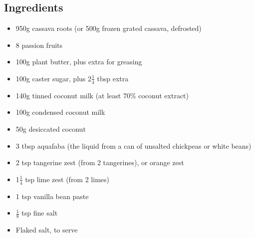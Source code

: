 \documentclass{book}
\begin{document}
\subsection*{Ingredients}
\begin{itemize}
\item 950g cassava roots (or 500g frozen grated cassava, defrosted)
\item 8 passion fruits
\item 100g plant butter, plus extra for greasing
\item 100g caster sugar, plus 2$\frac{1}{4}$ tbsp extra
\item 140g tinned coconut milk (at least 70\% coconut extract)
\item 100g condensed coconut milk
\item 50g desiccated coconut
\item 3 tbsp aquafaba (the liquid from a can of unsalted chickpeas or white beans)
\item 2 tsp tangerine zest (from 2 tangerines), or orange zest 
\item 1$\frac{1}{4}$ tsp lime zest (from 2 limes)
\item 1 tsp vanilla bean paste
\item $\frac{1}{8}$ tsp fine salt
\item Flaked salt, to serve
\end{itemize}
\end{document}

